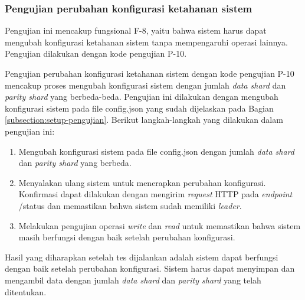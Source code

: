 \subsubsection{Pengujian perubahan konfigurasi ketahanan sistem}
\label{subsubsection:pengujian-perubahan-konfigurasi-ketahanan}

Pengujian ini mencakup fungsional F-8, yaitu bahwa sistem harus dapat mengubah konfigurasi ketahanan sistem tanpa mempengaruhi operasi lainnya. Pengujian dilakukan dengan kode pengujian P-10.

Pengujian perubahan konfigurasi ketahanan sistem dengan kode pengujian P-10 mencakup proses mengubah konfigurasi sistem dengan jumlah \textit{data shard} dan \textit{parity shard} yang berbeda-beda. Pengujian ini dilakukan dengan mengubah konfigurasi sistem pada file config.json yang sudah dijelaskan pada Bagian \ref{subsection:setup-pengujian}. Berikut langkah-langkah yang dilakukan dalam pengujian ini:

\begin{enumerate}
  \item Mengubah konfigurasi sistem pada file config.json dengan jumlah \textit{data shard} dan \textit{parity shard} yang berbeda.
  \item Menyalakan ulang sistem untuk menerapkan perubahan konfigurasi. Konfirmasi dapat dilakukan dengan mengirim \textit{request} HTTP pada \textit{endpoint} /status dan memastikan bahwa sistem sudah memiliki \textit{leader}.
  \item Melakukan pengujian operasi \textit{write} dan \textit{read} untuk memastikan bahwa sistem masih berfungsi dengan baik setelah perubahan konfigurasi.
\end{enumerate}

Hasil yang diharapkan setelah tes dijalankan adalah sistem dapat berfungsi dengan baik setelah perubahan konfigurasi. Sistem harus dapat menyimpan dan mengambil data dengan jumlah \textit{data shard} dan \textit{parity shard} yang telah ditentukan.